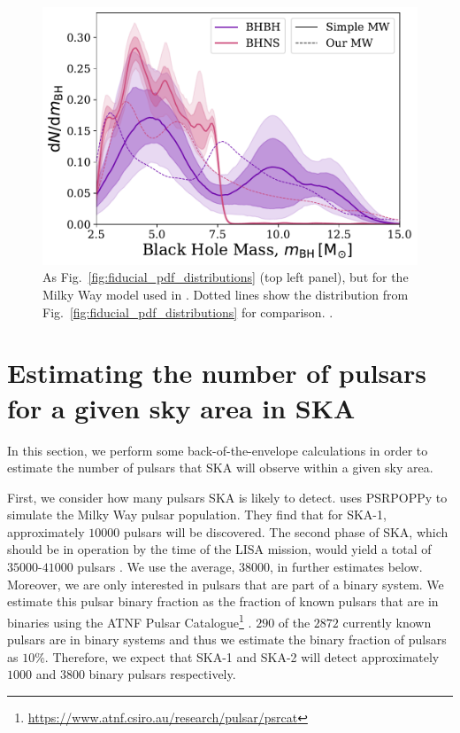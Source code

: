 \begin{figure}[htb]
    \centering
    \includegraphics[width=\columnwidth]{../figures/fig12_mBH_simple_mw_variation.pdf}
    \caption{As Fig.~\ref{fig:fiducial_pdf_distributions} (top left panel), but for the Milky Way model used in \citet{Breivik+2020}. Dotted lines show the distribution from Fig.~\ref{fig:fiducial_pdf_distributions} for comparison. \href{https://github.com/TomWagg/detecting-DCOs-in-LISA/blob/main/paper/figures/fig12_mBH_simple_mw_variation.pdf}{\faFileImage} \href{https://github.com/TomWagg/detecting-DCOs-in-LISA/blob/main/paper/figure_notebooks/fiducial.ipynb}{\faBook}.}
    \label{fig:bh_mass_simple_mw}
\end{figure}

\section{Estimating the number of pulsars for a given sky area in SKA}\label{app:ska_area}

In this section, we perform some back-of-the-envelope calculations in order to estimate the number of pulsars that SKA will observe within a given sky area.

First, we consider how many pulsars SKA is likely to detect. \citet{Keane+2015} uses PSRPOPPy \citep{Bates+2014} to simulate the Milky Way pulsar population. They find that for SKA-1, approximately $10000$ pulsars will be discovered. The second phase of SKA, which should be in operation by the time of the LISA mission, would yield a total of $35000$-$41000$ pulsars \citep{Keane+2015}. We use the average, $38000$, in further estimates below. Moreover, we are only interested in pulsars that are part of a binary system. We estimate this pulsar binary fraction as the fraction of known pulsars that are in binaries using the ATNF Pulsar Catalogue\footnote{\url{https://www.atnf.csiro.au/research/pulsar/psrcat}} \citep{Manchester+2005}. $290$ of the $2872$ currently known pulsars are in binary systems and thus we estimate the binary fraction of pulsars as $10\%$. Therefore, we expect that SKA-1 and SKA-2 will detect approximately $1000$ and $3800$ binary pulsars respectively.

